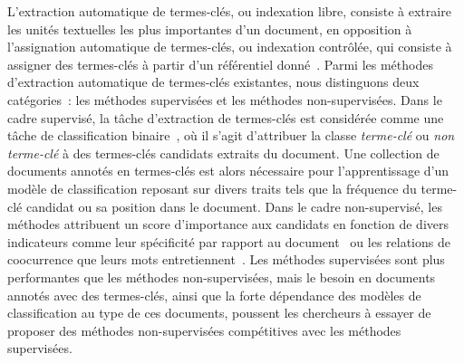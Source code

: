   L'extraction automatique de termes-clés, ou indexation libre,
  consiste à extraire les unités textuelles les plus importantes d'un document,
  en opposition à l'assignation automatique de termes-clés, ou
  indexation contrôlée, qui consiste à assigner des termes-clés à partir d'un
  référentiel donné~\cite{paroubek2012deft}. Parmi les méthodes d'extraction
  automatique de termes-clés existantes, nous distinguons deux catégories~: les
  méthodes supervisées et les méthodes non-supervisées. Dans le cadre supervisé,
  la tâche d'extraction de termes-clés est considérée comme une tâche de
  classification binaire~\cite{witten1999kea}, où il s'agit d'attribuer la
  classe \og{}\textit{terme-clé}\fg{} ou \og{}\textit{non terme-clé}\fg{} à des
  termes-clés candidats extraits du document. Une collection de documents
  annotés en termes-clés est alors nécessaire pour l'apprentissage d'un modèle
  de classification reposant sur divers traits tels que la fréquence du
  terme-clé candidat ou sa position dans le document. Dans le cadre
  non-supervisé, les méthodes attribuent un score d'importance aux candidats
  en fonction de divers indicateurs comme leur spécificité par rapport au
  document~\cite{paukkeri2010likey} ou les relations de coocurrence que leurs
  mots entretiennent~\cite{mihalcea2004textrank}. Les méthodes supervisées sont
  plus performantes que les méthodes non-supervisées, mais le besoin en
  documents annotés avec des termes-clés, ainsi que la forte dépendance des
  modèles de classification au type de ces documents, poussent les chercheurs à
  essayer de proposer des méthodes non-supervisées compétitives avec les
  méthodes supervisées.

